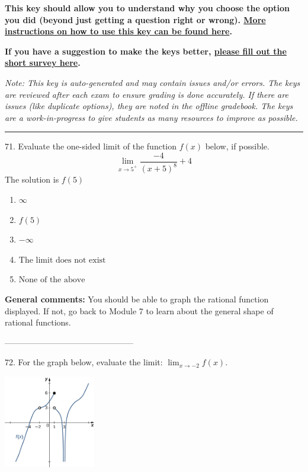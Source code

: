 \documentclass{extbook}[14pt]
\begin{document}
\textbf{This key should allow you to understand why you choose the option you did (beyond just getting a question right or wrong). \href{https://xronos.clas.ufl.edu/mac1105spring2020/courseDescriptionAndMisc/Exams/LearningFromResults}{More instructions on how to use this key can be found here}.}

\textbf{If you have a suggestion to make the keys better, \href{https://forms.gle/CZkbZmPbC9XALEE88}{please fill out the short survey here}.}

\textit{Note: This key is auto-generated and may contain issues and/or errors. The keys are reviewed after each exam to ensure grading is done accurately. If there are issues (like duplicate options), they are noted in the offline gradebook. The keys are a work-in-progress to give students as many resources to improve as possible.}

\rule{\textwidth}{0.4pt}

71. Evaluate the one-sided limit of the function $f(x)$ below, if possible.
\[ \lim_{x \rightarrow 5^+} \frac{-4}{(x+5)^8}+4 \] 
The solution is $ f(5) $ 

\begin{enumerate}[label=\Alph*.] 
\item $ \infty $ 

  
\item $ f(5) $ 

  
\item $ -\infty $ 

  
\item $ \text{The limit does not exist} $ 

  
\item $ \text{None of the above} $ 

  
\end{enumerate} 
 
\textbf{General comments:} You should be able to graph the rational function displayed. If not, go back to Module 7 to learn about the general shape of rational functions.

-----------------------------------------------

72. For the graph below, evaluate the limit: $ \displaystyle \lim_{x \rightarrow -2} f(x)$.
\begin{center} \includegraphics[width=0.3\textwidth]{../Figures/evaluateLimitGraphicallyC.png} \end{center} 
\end{document}
